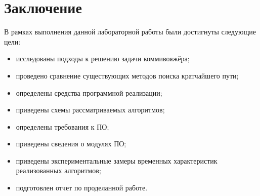 \chapter*{Заключение}

В рамках выполнения данной лабораторной работы были достигнуты следующие цели:
\begin{itemize}
	\item исследованы подходы к решению задачи коммивояжёра;
	\item проведено сравнение существующих методов поиска кратчайшего пути;
	\item определены средства программной реализации;
	\item приведены схемы рассматриваемых алгоритмов;
	\item определены требования к ПО;
	\item приведены сведения о модулях ПО;
	\item приведены экспериментальные замеры временных характеристик реализованных алгоритмов;
    \item подготовлен отчет по проделанной работе.
\end{itemize}